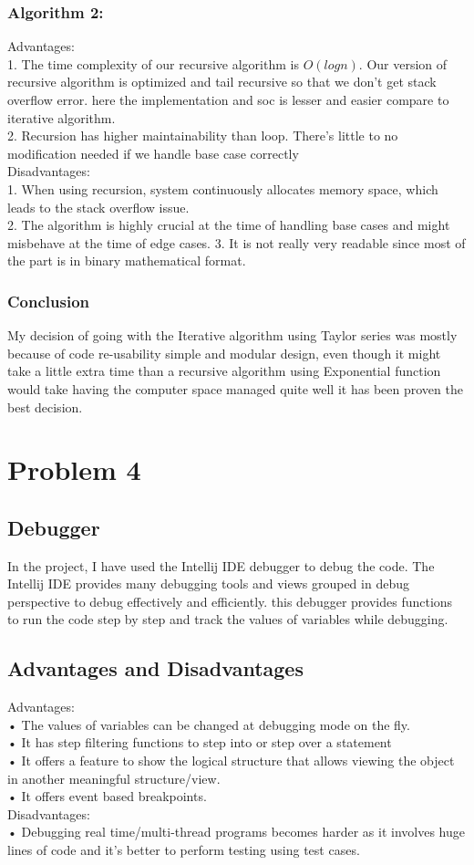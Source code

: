 \documentclass[a4paper, 11pt]{article}
\begin{document}
\subsubsection*{Algorithm 2:}
Advantages: \\ 
1. The time complexity of our recursive algorithm is $O (log n)$. Our version of recursive algorithm is optimized and tail recursive so that we don't get stack overflow error. here the implementation and soc is lesser and easier compare to iterative algorithm. \\
2. Recursion has higher maintainability than loop. There's little to no modification needed if we handle base case correctly\\
Disadvantages:\\
1. When using recursion, system continuously allocates memory space, which leads to the stack overflow issue. \\
2. The algorithm is highly crucial at the time of handling base cases and might misbehave at the time of edge cases. 
3. It is not really very readable since most of the part is in binary mathematical format.
\subsubsection*{Conclusion}
My decision of going with the Iterative algorithm using Taylor series was mostly because of code re-usability simple and modular design, even though it might take a little extra time than a recursive algorithm using Exponential function would take having the computer space managed quite well it has been proven the best decision.

\newpage
\section*{Problem 4}
\subsection{Debugger}
In the project, I have used the Intellij IDE debugger to debug the code. The
Intellij IDE provides many debugging tools and views grouped in debug
perspective to debug effectively and efficiently. this debugger provides
functions to run the code step by step and track the values of variables while
debugging. 
\subsection*{Advantages and Disadvantages}
Advantages: \\[0.2 cm]
• The values of variables can be changed at debugging mode on the fly.\\
• It has step filtering functions to step into or step over a statement\\
• It offers a feature to show the logical structure that allows viewing the
object in another meaningful structure/view.\\
• It offers event based breakpoints.\\[0.2 cm]
Disadvantages:\\[0.2 cm]
• Debugging real time/multi-thread programs becomes harder as it involves huge lines of code and it’s better to perform testing using test
cases.\\
\end{document}
